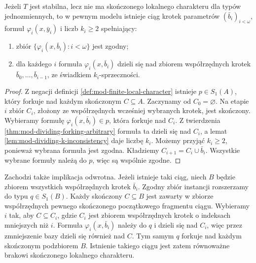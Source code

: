 \begin{lemat}
\label{lem:mod-infinite-forking-chain}
Jeżeli $T$ jest stabilna, lecz nie ma
skończonego lokalnego charakteru dla
typów jednozmiennych, to w pewnym modelu
istnieje ciąg krotek parametrów
$(\bar b_i)_{i<\omega}$, formuł
$\varphi_i(x,\bar y_i)$ i liczb $k_i\geq2$
spełniający:
\begin{enumerate}[label=(\roman*)]
\item zbiór $\{\varphi_i(x,\bar b_i):i<\omega\}$
jest zgodny;
\item dla każdego $i$ formuła
$\varphi_i(x,\bar b_i)$ dzieli się nad
zbiorem współrzędnych krotek
$\bar b_0,\ldots,\bar b_{i-1}$,
ze świadkiem $k_i$-sprzeczności.
\end{enumerate}
\end{lemat}
\begin{proof}
Z negacji definicji
\ref{def:mod-finite-local-character}
istnieje $p\in S_1(A)$, który forkuje
nad każdym skończonym $C\subseteq A$.
Zaczynamy od $C_0=\varnothing$.
Na etapie $i$ zbiór $C_i$, złożony
ze współrzędnych wcześniej wybranych
krotek, jest skończony.
Wybieramy formułę
$\varphi_i(x,\bar b_i)\in p$,
która forkuje nad $C_i$.
Z twierdzenia
\ref{thm:mod-dividing-forking-arbitrary}
formuła ta dzieli się nad $C_i$,
a lemat \ref{lem:mod-dividing-k-inconsistency}
daje liczbę $k_i$.
Możemy przyjąć $k_i\geq2$, ponieważ
wybrana formuła jest zgodna.
Kładziemy $C_{i+1}=C_i\cup\bar b_i$.
Wszystkie wybrane formuły należą do $p$,
więc są wspólnie zgodne.
\end{proof}

Zachodzi także implikacja odwrotna.
Jeżeli istnieje taki ciąg, niech $B$ będzie
zbiorem wszystkich współrzędnych krotek
$\bar b_i$. Zgodny zbiór instancji rozszerzamy
do typu $q\in S_1(B)$. Każdy skończony
$C\subseteq B$ jest zawarty w zbiorze
współrzędnych pewnego skończonego początkowego
fragmentu ciągu. Wybieramy $i$ tak, aby
$C\subseteq C_i$, gdzie $C_i$ jest zbiorem
współrzędnych krotek o indeksach mniejszych
niż $i$. Formuła $\varphi_i(x,\bar b_i)$
należy do $q$ i dzieli się nad $C_i$,
więc przez zmniejszenie bazy dzieli się
również nad $C$. Tym samym $q$ forkuje
nad każdym skończonym podzbiorem $B$.
Istnienie takiego ciągu jest zatem równoważne
brakowi skończonego lokalnego charakteru.

